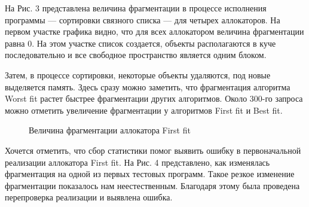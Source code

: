 \documentclass[12pt,a4paper]{article}
\begin{document}
   На Рис. 3 представлена величина фрагментации в процессе исполнения программы --- сортировки связного списка --- для четырех аллокаторов. На первом участке графика
   видно, что для всех аллокатором величина фрагментации равна 0. На этом участке список создается, объекты располагаются в куче последовательно и все свободное
   пространство является одним блоком. 
   
   Затем, в процессе сортировки, некоторые объекты удаляются, под новые выделяется память. Здесь сразу можно заметить, что фрагментация алгоритма Worst fit растет
   быстрее фрагментации других алгоритмов. Около 300-го запроса можно отметить увеличение фрагментации у алгоритмов First fit и Best fit. 
   
   \begin{figure}[p]
   \caption{Величина фрагментации аллокатора First fit}
   \label{ris:image}
   \end{figure}
   
    Хочется отметить, что сбор статистики помог выявить ошибку в первоначальной реализации аллокатора First fit. На Рис. 4 представлено, как изменялась фрагментация
   на одной из первых тестовых программ. 
   Такое резкое изменение фрагментации показалось нам неестественным. Благодаря этому была проведена перепроверка реализации и 
   выявлена ошибка.
   
\end{document}
